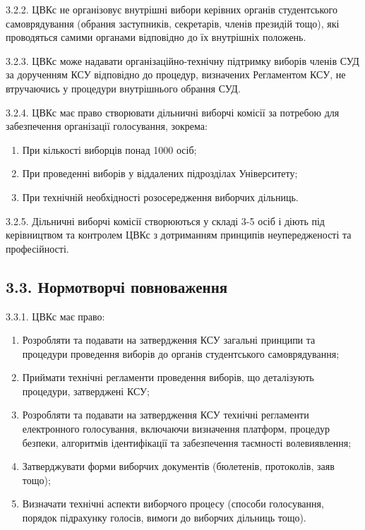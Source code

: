     3.2.2. ЦВКс не організовує внутрішні вибори керівних органів студентського самоврядування (обрання заступників, секретарів, членів президій тощо), які проводяться самими органами відповідно до їх внутрішніх положень.

    3.2.3. ЦВКс може надавати організаційно-технічну підтримку виборів членів СУД за дорученням КСУ відповідно до процедур, визначених Регламентом КСУ, не втручаючись у процедури внутрішнього обрання СУД.

    3.2.4. ЦВКс має право створювати дільничні виборчі комісії за потребою для забезпечення організації голосування, зокрема:

        \begin{enumerate}[label=\alph*)]
            \item При кількості виборців понад 1000 осіб;
            \item При проведенні виборів у віддалених підрозділах Університету;
            \item При технічній необхідності розосередження виборчих дільниць.
        \end{enumerate}

    3.2.5. Дільничні виборчі комісії створюються у складі 3-5 осіб і діють під керівництвом та контролем ЦВКс з дотриманням принципів неупередженості та професійності.

\subsection*{3.3. Нормотворчі повноваження}
    3.3.1. ЦВКс має право:

        \begin{enumerate}[label=\alph*)]
            \item Розробляти та подавати на затвердження КСУ загальні принципи та процедури проведення виборів до органів студентського самоврядування;
            \item Приймати технічні регламенти проведення виборів, що деталізують процедури, затверджені КСУ;
            \item Розробляти та подавати на затвердження КСУ технічні регламенти електронного голосування, включаючи визначення платформ, процедур безпеки, алгоритмів ідентифікації та забезпечення таємності волевиявлення;
            \item Затверджувати форми виборчих документів (бюлетенів, протоколів, заяв тощо);
            \item Визначати технічні аспекти виборчого процесу (способи голосування, порядок підрахунку голосів, вимоги до виборчих дільниць тощо).
        \end{enumerate}

